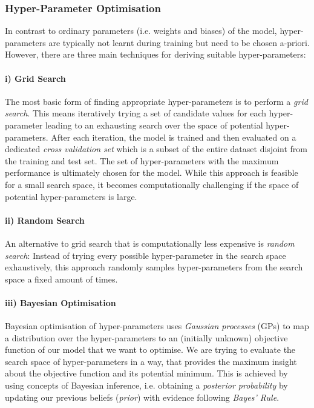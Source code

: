 \subsubsection{Hyper-Parameter Optimisation}
In contrast to ordinary parameters (i.e. weights and biases) of the model, hyper-parameters are typically not learnt during training but need to be chosen a-priori. However, there are three main techniques for deriving suitable hyper-parameters:

\paragraph{i) Grid Search} The most basic form of finding appropriate hyper-parameters is to perform a \emph{grid search}. This means iteratively trying a set of candidate values for each hyper-parameter leading to an exhausting search over the space of potential hyper-parameters. After each iteration, the model is trained and then evaluated on a dedicated \emph{cross validation set} which is a subset of the entire dataset disjoint from the training and test set. The set of hyper-parameters with the maximum performance is ultimately chosen for the model.   
While this approach is feasible for a small search space, it becomes computationally challenging if the space of potential hyper-parameters is large. 

\paragraph{ii) Random Search} An alternative to grid search that is computationally less expensive is \emph{random search}: Instead of trying every possible hyper-parameter in the search space exhaustively, this approach randomly samples hyper-parameters from the search space a fixed amount of times. 

\paragraph{iii) Bayesian Optimisation} Bayesian optimisation \cite{bayesian-optimisation} of hyper-parameters uses \emph{Gaussian processes} (GPs) to map a distribution over the hyper-parameters to an (initially unknown) objective function of our model that we want to optimise. We are trying to evaluate the search space of hyper-parameters in a way, that provides the maximum insight about the objective function and its potential minimum.  This is achieved by using concepts of Bayesian inference, i.e. obtaining a \emph{posterior probability} by updating our previous beliefs (\emph{prior}) with evidence following \emph{Bayes' Rule}. 

